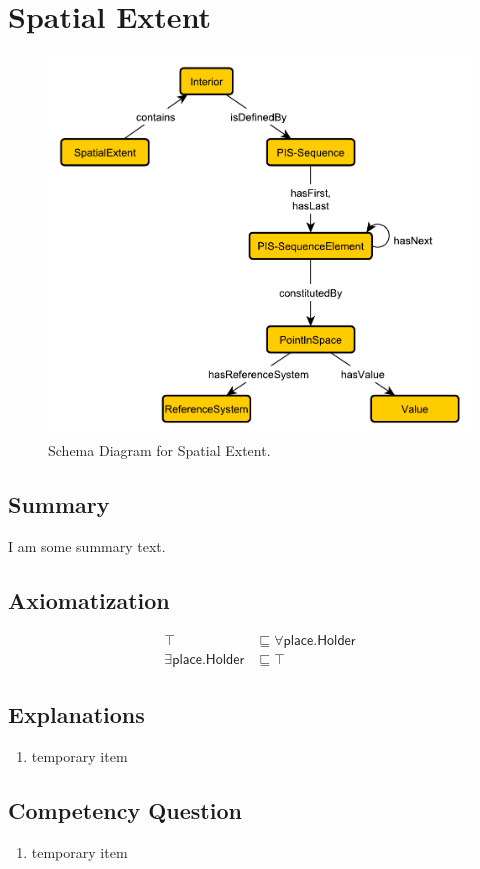 \section{Spatial Extent}
\label{sec:Spatial}
\begin{figure}[h!]
\begin{center}
\includegraphics[width=.4\textwidth]{figures/spatial}
\end{center}
\caption{Schema Diagram for Spatial Extent.}
\label{fig:Spatial}
\end{figure}
\subsection{Summary}
\label{sum:Spatial}
I am some summary text.

\subsection{Axiomatization}
\label{axs:Spatial}
\begin{align}
\top &\sqsubseteq \forall\textsf{place.Holder} \\ 
\exists\textsf{place.Holder} &\sqsubseteq \top 
\end{align}

\subsection{Explanations}
\label{exp:Spatial}
\begin{enumerate}
\item temporary item
\end{enumerate}

\subsection{Competency Question}
\label{cqs:Spatial}
\begin{enumerate}[CQ1.]
\item temporary item
\end{enumerate}

\newpage
